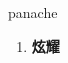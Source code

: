 
\begin{frame}
{\huge panache}
\begin{center}
\begin{enumerate}\Large
  \item \textbf{炫耀}
\end{enumerate}
\end{center}
\end{frame}
